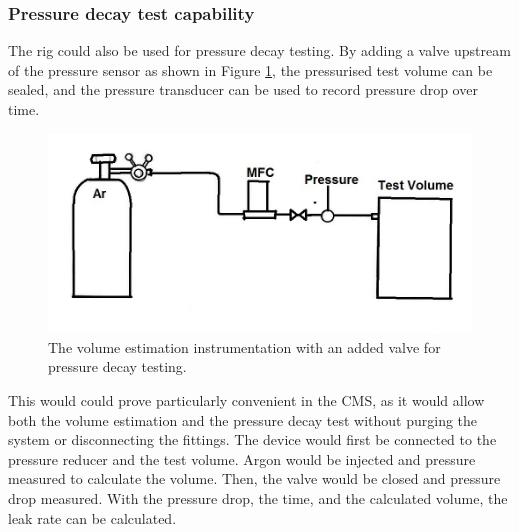 \documentclass{report}
\begin{document}
\subsubsection{Pressure decay test capability}
The rig could also be used for pressure decay testing. By adding a valve upstream of the pressure sensor as shown in Figure \ref{schematicWithValve}, the pressurised test volume can be sealed, and the pressure transducer can be used to record pressure drop over time. 
\begin{figure}[h]
\includegraphics[width=\textwidth]{schematicWithValve}
\caption{The volume estimation instrumentation with an added valve for pressure decay testing.}
\label{schematicWithValve}
\end{figure}
This would could prove particularly convenient in the CMS, as it would allow both the volume estimation and the pressure decay test without purging the system or disconnecting the fittings. The device would first be connected to the pressure reducer and the test volume. Argon would be injected and pressure measured to calculate the volume. Then, the valve would be closed and pressure drop measured. With the pressure drop, the time, and the calculated volume, the leak rate can be calculated. 
\end{document}

